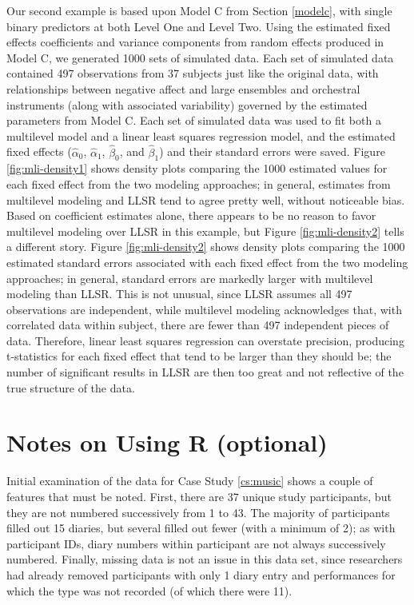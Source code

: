 \documentclass[
]{krantz}
\begin{document}
Our second example is based upon Model C from Section \ref{modelc}, with single binary predictors at both Level One and Level Two. Using the estimated fixed effects coefficients and variance components from random effects produced in Model C, we generated 1000 sets of simulated data. Each set of simulated data contained 497 observations from 37 subjects just like the original data, with relationships between negative affect and large ensembles and orchestral instruments (along with associated variability) governed by the estimated parameters from Model C. Each set of simulated data was used to fit both a multilevel model and a linear least squares regression model, and the estimated fixed effects (\(\hat{\alpha}_{0}\), \(\hat{\alpha}_{1}\), \(\hat{\beta}_{0}\), and \(\hat{\beta}_{1}\)) and their standard errors were saved. Figure \ref{fig:mli-density1} shows density plots comparing the 1000 estimated values for each fixed effect from the two modeling approaches; in general, estimates from multilevel modeling and LLSR tend to agree pretty well, without noticeable bias. Based on coefficient estimates alone, there appears to be no reason to favor multilevel modeling over LLSR in this example, but Figure \ref{fig:mli-density2} tells a different story. Figure \ref{fig:mli-density2} shows density plots comparing the 1000 estimated standard errors associated with each fixed effect from the two modeling approaches; in general, standard errors are markedly larger with multilevel modeling than LLSR. This is not unusual, since LLSR assumes all 497 observations are independent, while multilevel modeling acknowledges that, with correlated data within subject, there are fewer than 497 independent pieces of data. Therefore, linear least squares regression can overstate precision, producing t-statistics for each fixed effect that tend to be larger than they should be; the number of significant results in LLSR are then too great and not reflective of the true structure of the data.

\section{Notes on Using R (optional)}\label{notesr8}

Initial examination of the data for Case Study \ref{cs:music} shows a couple of features that must be noted. First, there are 37 unique study participants, but they are not numbered successively from 1 to 43. The majority of participants filled out 15 diaries, but several filled out fewer (with a minimum of 2); as with participant IDs, diary numbers within participant are not always successively numbered. Finally, missing data is not an issue in this data set, since researchers had already removed participants with only 1 diary entry and performances for which the type was not recorded (of which there were 11).
\end{document}
